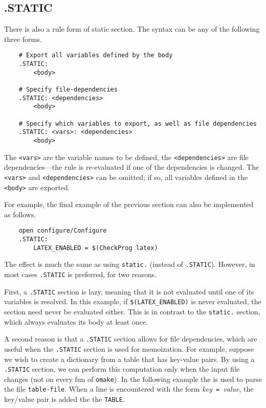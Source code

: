 \subsection{.STATIC}
\label{section:.STATIC}

\newinreorg

There is also a rule form of static section.  The syntax can be any of the following three forms.

\begin{verbatim}
    # Export all variables defined by the body
    .STATIC:
        <body>

    # Specify file-dependencies
    .STATIC: <dependencies>
        <body>

    # Specify which variables to export, as well as file dependencies
    .STATIC: <vars>: <dependencies>
        <body>
\end{verbatim}

The \verb+<vars>+ are the variable names to be defined, the \verb+<dependencies>+ are file
dependencies---the rule is re-evaluated if one of the dependencies is changed.  The \verb+<vars>+
and \verb+<dependencies>+ can be omitted; if so, all variables defined in the \verb+<body>+ are
exported.

For example, the final example of the previous section can also be implemented as follows.

\begin{verbatim}
    open configure/Configure
    .STATIC:
        LATEX_ENABLED = $(CheckProg latex)
\end{verbatim}
%
The effect is much the same as using \verb+static.+ (instead of \verb+.STATIC+).  However, in most
cases \verb+.STATIC+ is preferred, for two reasons.

First, a \verb+.STATIC+ section is lazy, meaning that it is not evaluated until one of its variables
is resolved.  In this example, if \verb+$(LATEX_ENABLED)+ is never evaluated, the section need never
be evaluated either.  This is in contrast to the \verb+static.+ section, which always evaluates its
body at least once.

A second reason is that a \verb+.STATIC+ section allows for file dependencies, which are useful when
the \verb+.STATIC+ section is used for memoization.  For example, suppose we wish to create a
dictionary from a table that has key-value pairs.  By using a \verb+.STATIC+ section, we can perform
this computation only when the input file changes (not on every fun of \verb+omake+).  In the
following example the  is used to parse the file \verb+table-file+.
When a line is encountered with the form \textit{key}\verb+ = +\textit{value}, the key/value pair is
added the the \verb+TABLE+.

